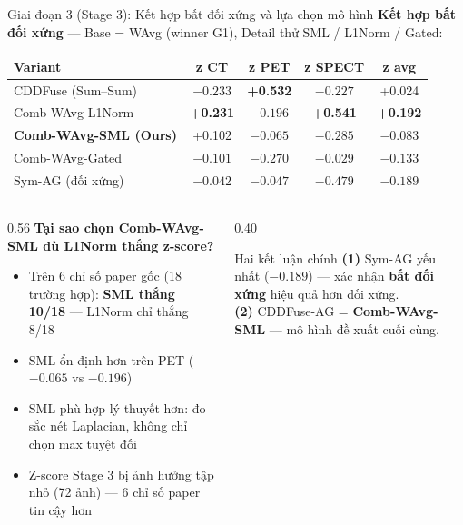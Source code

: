 \documentclass[t, aspectratio=169]{beamer}
\begin{document}
\begin{frame}{Giai đoạn 3 (Stage 3): Kết hợp bất đối xứng và lựa chọn mô hình}
    \textbf{Kết hợp bất đối xứng} --- Base = WAvg (winner G1), Detail thử SML / L1Norm / Gated:
    \vspace{0.2em}
    \small
    \begin{tabular}{lcccc}
        \toprule
        \textbf{Variant} & \textbf{z CT} & \textbf{z PET} & \textbf{z SPECT} & \textbf{z avg} \\
        \midrule
        CDDFuse (Sum--Sum)             & $-0.233$ & \textbf{+0.532} & $-0.227$ & +0.024 \\
        Comb-WAvg-L1Norm               & \textbf{+0.231} & $-0.196$ & \textbf{+0.541} & \textbf{+0.192} \\
        \rowcolor{red!12}
        \textbf{Comb-WAvg-SML (Ours)}  & +0.102 & $-0.065$ & $-0.285$ & $-0.083$ \\
        Comb-WAvg-Gated                & $-0.101$ & $-0.270$ & $-0.029$ & $-0.133$ \\
        Sym-AG (đối xứng)              & $-0.042$ & $-0.047$ & $-0.479$ & $-0.189$ \\
        \bottomrule
    \end{tabular}
    \vspace{0.3em}
    \begin{columns}[T]
        \begin{column}{0.56\textwidth}
            \small\textbf{Tại sao chọn Comb-WAvg-SML dù L1Norm thắng z-score?}
            \begin{itemize}\itemsep1pt
                \item Trên 6 chỉ số paper gốc (18 trường hợp): \textbf{SML thắng 10/18} --- L1Norm chỉ thắng 8/18
                \item SML ổn định hơn trên PET ($-0.065$ vs $-0.196$)
                \item SML phù hợp lý thuyết hơn: đo sắc nét Laplacian, không chỉ chọn max tuyệt đối
                \item Z-score Stage 3 bị ảnh hưởng tập nhỏ (72 ảnh) --- 6 chỉ số paper tin cậy hơn
            \end{itemize}
        \end{column}
        \begin{column}{0.40\textwidth}
            \begin{alertblock}{\small Hai kết luận chính}
                \small \textbf{(1)} Sym-AG yếu nhất ($-0.189$) --- xác nhận \textbf{bất đối xứng} hiệu quả hơn đối xứng.\\[4pt]
                \textbf{(2)} CDDFuse-AG = \textbf{Comb-WAvg-SML} --- mô hình đề xuất cuối cùng.
            \end{alertblock}
        \end{column}
    \end{columns}
\end{frame}
\end{document}
